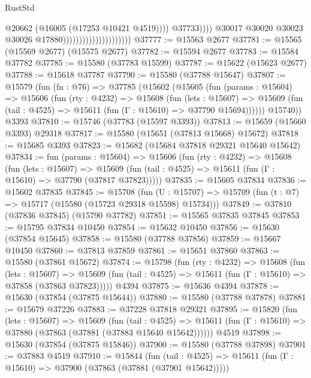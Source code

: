 \begin{lexlean}{RustStd}
\begin{coremodule}
                                                          @20662
                                                          (@16005 (@17253 @10421 @4519))))
                                                      @37733))))
                                              @30017
                                              @30020
                                              @30023
                                              @30026
                                              @17880)))))))))))))))))))))
@37777 := @15563 @2677
@37781 := @15565 (@15569 @2677) (@15575 @2677)
@37782 := @15594 @2677
@37783 := @15584 @37782
@37785 := @15580 (@37783 @15599)
@37787 := @15622 (@15623 @2677)
@37788 := @15618 @37787
@37790 := @15580 (@37788 @15647)
@37807 := @15579
    (fun (fn : @76) =>
    @37785
      (@15602
        (@15605
          (fun (params : @15604) =>
          @15606
            (fun (rty : @4232) =>
            @15608
              (fun (lets : @15607) =>
              @15609 (fun (tail : @4525) => @15611 (fun (Γ : @15610) => @37790 @15694))))))
        @15740))
    @3393
@37810 := @15746 (@37783 (@15597 @3393))
@37813 := @15659 (@15660 @3393) @29318
@37817 := @15580 (@15651 (@37813 @15668) @15672)
@37818 := @15685 @3393
@37823 := @15682 (@15684 @37818 @29321 @15640 @15642)
@37834 := fun (params : @15604) =>
  @15606
    (fun (rty : @4232) =>
    @15608
      (fun (lets : @15607) =>
      @15609 (fun (tail : @4525) => @15611 (fun (Γ : @15610) => @37790 (@37817 @37823)))))
@37835 := @15605 @37834
@37836 := @15602 @37835
@37845 := @15708
    (fun (U : @15707) => @15709 (fun (t : @7) => @15717 (@15580 (@15723 @29318 @15598) @15734)))
@37849 := @37810 (@37836 @37845) (@15790 @37782)
@37851 := @15565 @37835 @37845
@37853 := @15795 @37834 @10450
@37854 := @15632 @10450
@37856 := @15630 (@37854 @15645)
@37858 := @15580 (@37788 @37856)
@37859 := @15667 @10450
@37860 := @37813 @37859
@37861 := @15651 @37860
@37863 := @15580 (@37861 @15672)
@37874 := @15798
    (fun (rty : @4232) =>
    @15608
      (fun (lets : @15607) =>
      @15609 (fun (tail : @4525) => @15611 (fun (Γ : @15610) => @37858 (@37863 @37823)))))
    @4394
@37875 := @15636 @4394
@37878 := @15630 (@37854 (@37875 @15644))
@37880 := @15580 (@37788 @37878)
@37881 := @15679 @37226
@37883 := @37228 @37818 @29321
@37895 := @15820
    (fun (lets : @15607) =>
    @15609
      (fun (tail : @4525) =>
      @15611 (fun (Γ : @15610) => @37880 (@37863 (@37881 (@37883 @15640 @15642))))))
    @4519
@37898 := @15630 (@37854 (@37875 @15846))
@37900 := @15580 (@37788 @37898)
@37901 := @37883 @4519
@37910 := @15844
    (fun (tail : @4525) => @15611 (fun (Γ : @15610) => @37900 (@37863 (@37881 (@37901 @15642)))))

\end{coremodule}
\end{lexlean}
